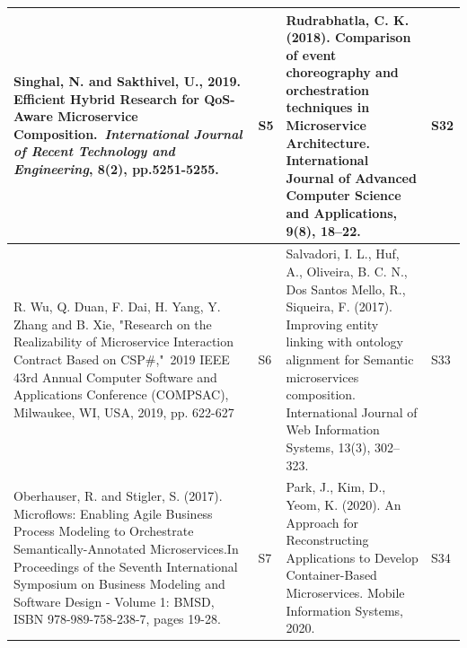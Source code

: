 \documentclass{article}
\begin{document}
\begin{appendices}
\begin{table}
\begin{center}
\begin{tabular}{ | m{20em} | m{1cm}| m{20em} | m{1cm} | }
Singhal, N. and Sakthivel, U., 2019. Efficient Hybrid Research for QoS-Aware Microservice Composition.~\textit{International Journal of Recent Technology and Engineering}, 8(2), pp.5251-5255.                                                                                                                                                           & S5             & Rudrabhatla, C. K. (2018). Comparison of event choreography and orchestration techniques in Microservice Architecture. International Journal of Advanced Computer Science and Applications, 9(8), 18–22.                                                                                                                                                                                                                       & S32             \\ 
\hline
\textcolor[rgb]{0.2,0.2,0.2}{R. Wu, Q. Duan, F. Dai, H. Yang, Y. Zhang and B. Xie, "Research on the Realizability of Microservice Interaction Contract Based on CSP\#,"~}\textcolor[rgb]{0.2,0.2,0.2}{2019 IEEE 43rd Annual Computer Software and Applications Conference (COMPSAC)}\textcolor[rgb]{0.2,0.2,0.2}{, Milwaukee, WI, USA, 2019, pp. 622-627} & S6             & Salvadori, I. L., Huf, A., Oliveira, B. C. N., Dos Santos Mello, R.,  Siqueira, F. (2017). Improving entity linking with ontology alignment for Semantic microservices composition. International Journal of Web Information Systems, 13(3), 302–323.                                                                                                                                                                          & S33             \\ 
\hline
\textcolor[rgb]{0.333,0.333,0.333}{Oberhauser, R. and Stigler, S. (2017). Microflows: Enabling Agile Business Process Modeling to Orchestrate Semantically-Annotated Microservices.In Proceedings of the Seventh International Symposium on Business Modeling and Software Design - Volume 1: BMSD, ISBN 978-989-758-238-7, pages 19-28.}                 & S7             & Park, J., Kim, D.,  Yeom, K. (2020). An Approach for Reconstructing Applications to Develop Container-Based Microservices. Mobile Information Systems, 2020.                                                                                                                                                                                                                                                                   & S34             \\ 
\hline

\end{tabular}
\end{center}
\end{table}
\end{appendices}
\end{document}
